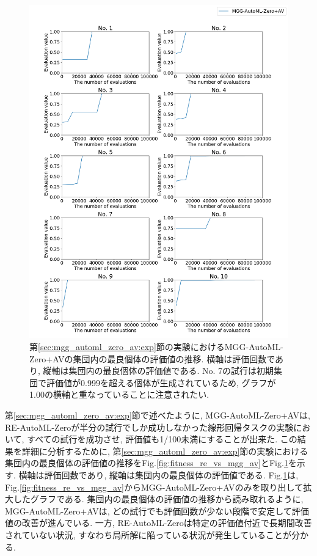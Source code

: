 \documentclass[11pt,oneside,openany,report]{jsbook}
\begin{document}
\begin{figure}[tbp]
  \centering
  \includegraphics[width=14cm]{fitness_mgg_av.png}
  \caption{第\ref{sec:mgg_automl_zero_av:exp}節の実験におけるMGG-AutoML-Zero+AVの集団内の最良個体の評価値の推移. 横軸は評価回数であり, 縦軸は集団内の最良個体の評価値である. No. 7の試行は初期集団で評価値が0.999を超える個体が生成されているため, グラフが1.00の横軸と重なっていることに注意されたい. }
  \label{fig:fitness_mgg_av}
\end{figure}

第\ref{sec:mgg_automl_zero_av:exp}節で述べたように, MGG-AutoML-Zero+AVは, RE-AutoML-Zeroが半分の試行でしか成功しなかった線形回帰タスクの実験において, すべての試行を成功させ, 評価値も1/100未満にすることが出来た. この結果を詳細に分析するために, 第\ref{sec:mgg_automl_zero_av:exp}節の実験における集団内の最良個体の評価値の推移をFig.\ref{fig:fitness_re_vs_mgg_av}とFig.\ref{fig:fitness_mgg_av}を示す. 横軸は評価回数であり, 縦軸は集団内の最良個体の評価値である. Fig.\ref{fig:fitness_mgg_av}は, Fig.\ref{fig:fitness_re_vs_mgg_av}からMGG-AutoML-Zero+AVのみを取り出して拡大したグラフである. 集団内の最良個体の評価値の推移から読み取れるように, MGG-AutoML-Zero+AVは, どの試行でも評価回数が少ない段階で安定して評価値の改善が進んでいる. 一方, RE-AutoML-Zeroは特定の評価値付近で長期間改善されていない状況, すなわち局所解に陥っている状況が発生していることが分かる.
\end{document}
